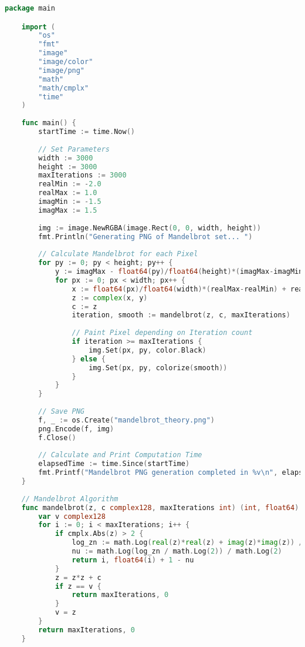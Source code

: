 \begin{lstlisting}[language=go, frame=tb, caption={Mandelbrot Set Calculation}]
    package main

    import (
        "os"
        "fmt"
        "image"
        "image/color"
        "image/png"
        "math"
        "math/cmplx"
        "time"
    )
    
    func main() {
        startTime := time.Now()
    
        // Set Parameters
        width := 3000
        height := 3000
        maxIterations := 3000
        realMin := -2.0
        realMax := 1.0
        imagMin := -1.5
        imagMax := 1.5
    
        img := image.NewRGBA(image.Rect(0, 0, width, height))
        fmt.Println("Generating PNG of Mandelbrot set... ")
    
        // Calculate Mandelbrot for each Pixel
        for py := 0; py < height; py++ {
            y := imagMax - float64(py)/float64(height)*(imagMax-imagMin)
            for px := 0; px < width; px++ {
                x := float64(px)/float64(width)*(realMax-realMin) + realMin
                z := complex(x, y)
                c := z
                iteration, smooth := mandelbrot(z, c, maxIterations)
    
                // Paint Pixel depending on Iteration count
                if iteration >= maxIterations {
                    img.Set(px, py, color.Black)
                } else {
                    img.Set(px, py, colorize(smooth))
                }
            }
        }
    
        // Save PNG
        f, _ := os.Create("mandelbrot_theory.png")
        png.Encode(f, img)
        f.Close()
    
        // Calculate and Print Computation Time
        elapsedTime := time.Since(startTime)
        fmt.Printf("Mandelbrot PNG generation completed in %v\n", elapsedTime)
    }
    
    // Mandelbrot Algorithm
    func mandelbrot(z, c complex128, maxIterations int) (int, float64) {
        var v complex128
        for i := 0; i < maxIterations; i++ {
            if cmplx.Abs(z) > 2 {
                log_zn := math.Log(real(z)*real(z) + imag(z)*imag(z)) / 2
                nu := math.Log(log_zn / math.Log(2)) / math.Log(2)
                return i, float64(i) + 1 - nu
            }
            z = z*z + c
            if z == v {
                return maxIterations, 0
            }
            v = z
        }
        return maxIterations, 0
    }
    

\end{lstlisting}
